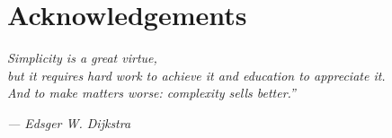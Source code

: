 
 \chapter*{Acknowledgements}

  \emph{Simplicity is a great virtue,\\
  but it requires hard work to achieve it and education to appreciate it.\\
  And to make matters worse: complexity sells better.''}

  \hfill\emph{--- Edsger W. Dijkstra}\\






